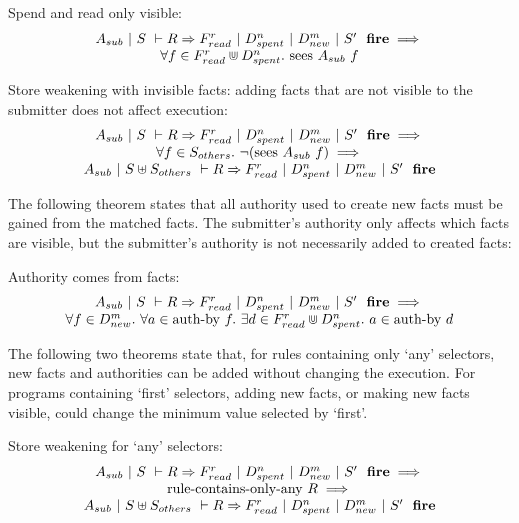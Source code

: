 \begin{theorem}
Spend and read only visible:
$$
\begin{array}{c}
A_{sub}~|~S~\vdash R \Rightarrow F_{read}^r~|~D_{spent}^n~|~D_{new}^m~|~S'~~\textbf{fire}
\implies \\
\forall f \in F_{read}^r \Cup D_{spent}^n.\ \textrm{sees}~ A_{sub}~ f
\end{array}
$$
\end{theorem}

\begin{theorem}
Store weakening with invisible facts: adding facts that are not visible to the submitter does not affect execution:
$$
\begin{array}{c}
A_{sub}~|~S~\vdash R \Rightarrow F_{read}^r~|~D_{spent}^n~|~D_{new}^m~|~S'~~\textbf{fire}
\implies \\
\forall f \in S_{others}.\ \neg (\textrm{sees}~ A_{sub}~ f)
\implies \\
A_{sub}~|~S \uplus S_{others}~\vdash R \Rightarrow F_{read}^r~|~D_{spent}^n~|~D_{new}^m~|~S'~~\textbf{fire}
\end{array}
$$
\end{theorem}

The following theorem states that all authority used to create new facts must be gained from the matched facts.
The submitter's authority only affects which facts are visible, but the submitter's authority is not necessarily added to created facts:

\begin{theorem}
Authority comes from facts:
$$
\begin{array}{c}
A_{sub}~|~S~\vdash R \Rightarrow F_{read}^r~|~D_{spent}^n~|~D_{new}^m~|~S'~~\textbf{fire}
\implies \\
\forall f \in D_{new}^m.\ \forall a \in \textrm{auth-by}~f.\ \exists d \in F_{read}^r \Cup D_{spent}^n.\ a \in \textrm{auth-by}~d
\end{array}
$$
\end{theorem}

The following two theorems state that, for rules containing only `any' selectors, new facts and authorities can be added without changing the execution.
For programs containing `first' selectors, adding new facts, or making new facts visible, could change the minimum value selected by `first'.

\begin{theorem}
Store weakening for `any' selectors:
$$
\begin{array}{c}
A_{sub}~|~S~\vdash R \Rightarrow F_{read}^r~|~D_{spent}^n~|~D_{new}^m~|~S'~~\textbf{fire}
\implies \\
\textrm{rule-contains-only-any}~R \implies \\
A_{sub}~|~S \uplus S_{others}~\vdash R \Rightarrow F_{read}^r~|~D_{spent}^n~|~D_{new}^m~|~S'~~\textbf{fire}
\end{array}
$$
\end{theorem}

